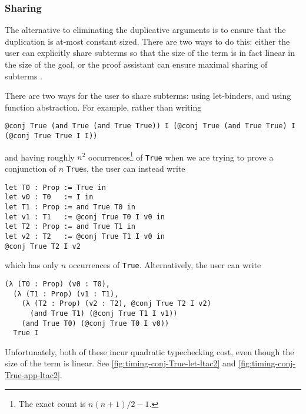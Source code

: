 \subsubsection{Sharing} \label{sec:sharing}
The alternative to eliminating the duplicative arguments is to ensure that the duplication is at-most constant sized.
There are two ways to do this: either the user can explicitly share subterms so that the size of the term is in fact linear in the size of the goal, or the proof assistant can ensure maximal sharing of subterms .

There are two ways for the user to share subterms: using let-binders, and using function abstraction.
For example, rather than writing
\begin{verbatim}
@conj True (and True (and True True)) I (@conj True (and True True) I (@conj True True I I))
\end{verbatim}
and having roughly $n^2$ occurrences\footnote{The exact count is $n(n+1)/2 - 1$.} of \texttt{True} when we are trying to prove a conjunction of $n$ \texttt{True}s, the user can instead write
\begin{verbatim}
let T0 : Prop := True in
let v0 : T0   := I in
let T1 : Prop := and True T0 in
let v1 : T1   := @conj True T0 I v0 in
let T2 : Prop := and True T1 in
let v2 : T2   := @conj True T1 I v0 in
@conj True T2 I v2
\end{verbatim}
which has only $n$ occurrences of \texttt{True}.
Alternatively, the user can write
\begin{verbatim}
(λ (T0 : Prop) (v0 : T0),
  (λ (T1 : Prop) (v1 : T1),
    (λ (T2 : Prop) (v2 : T2), @conj True T2 I v2)
      (and True T1) (@conj True T1 I v1))
    (and True T0) (@conj True T0 I v0))
  True I
\end{verbatim}

Unfortunately, both of these incur quadratic typechecking cost, even though the size of the term is linear.
See \autoref{fig:timing-conj-True-let-ltac2} and \autoref{fig:timing-conj-True-app-ltac2}.

